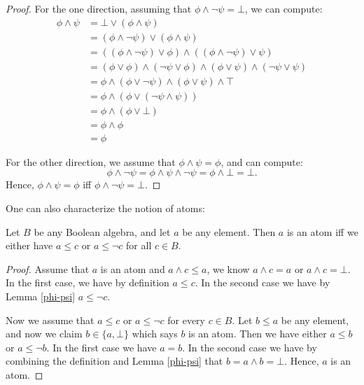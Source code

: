 \begin{proof}
For the one direction, assuming that $\phi \land \neg \psi = \bot$, we can compute:
\begin{equation*}
\begin{split} 
\phi \land \psi &= \bot \lor (\phi \land \psi)\\
&= (\phi \land \neg \psi) \lor (\phi \land \psi)\\
&= ((\phi \land \neg \psi) \lor \phi) \land ((\phi \land \neg \psi) \lor \psi)\\
&= (\phi \lor \phi) \land (\neg \psi \lor \phi) \land (\phi \lor \psi) \land (\neg \psi \lor \psi)\\
&= \phi \land (\phi \lor \neg \psi) \land (\phi \lor \psi) \land \top\\
&= \phi \land (\phi \lor (\neg \psi \land \psi))\\
&= \phi \land (\phi \lor \bot)\\
&= \phi \land \phi\\
&= \phi
\end{split}
\end{equation*}

For the other direction, we assume that $\phi \land \psi = \phi$, and can compute:
\[\phi \land \neg \psi = \phi \land \psi \land \neg \psi = \phi \land \bot = \bot.\]
Hence, $\phi \land \psi = \phi$ iff $\phi \land \neg \psi = \bot$.
\end{proof}

One can also characterize the notion of atoms:

\begin{lem}
\label{atom-char}
Let $B$ be any Boolean algebra, and let $a$ be any element. Then $a$ is an atom iff we either have $a \leq c$ or $a \leq \neg c$ for all $c \in B$.
\end{lem}

\begin{proof}
Assume that $a$ is an atom and $a \land c \leq a$, we know $a \land c = a$ or $a \land c = \bot$. In the first case, we have by definition $a \leq c$. In the second case we have by Lemma \ref{phi-psi} $a \leq \neg c$.

Now we assume that $a \leq c$ or $a \leq \neg c$ for every $c \in B$. Let $b \leq a$ be any element, and now we claim $b \in \{a, \bot\}$ which says $b$ is an atom. Then we have either $a \leq b$ or $a \leq \neg b$. In the first case we have $a = b$. In the second case we have by combining the definition and Lemma \ref{phi-psi} that $b = a \land b = \bot$. Hence, $a$ is an atom.
\end{proof}

